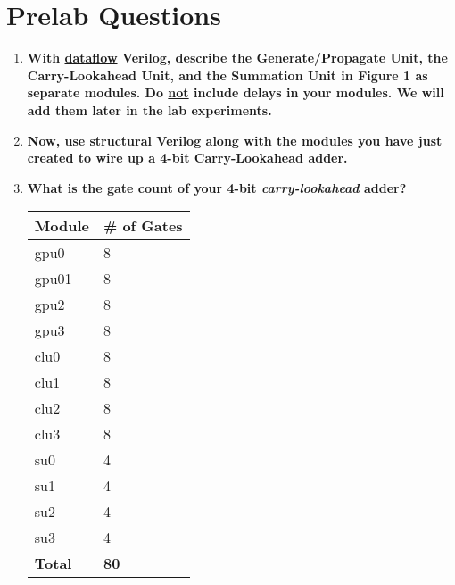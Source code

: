 \documentclass[a4paper,12pt]{article}
\begin{document}
\section*{Prelab Questions}

% 

\begin{enumerate}
  \item \textbf{With \underline{dataflow} Verilog, describe the Generate/Propagate Unit, the Carry-Lookahead Unit, and the Summation Unit in Figure 1 as separate modules. 
  Do \underline{not} include delays in your modules. We will add them later in the lab experiments.}
  
    
    
    
    
    

  \item \textbf{Now, use structural Verilog along with the modules you have just created to wire up a 4-bit Carry-Lookahead adder.}
  
  


  
  \item \textbf{What is the gate count of your 4-bit \textit{carry-lookahead} adder?}
  
  \begin{table}[h]
\centering
  \begin{tabular}{l l}
  Module & \# of Gates \\ \hline \hline
  gpu0   & 8           \\ 
  gpu01  & 8           \\ 
  gpu2   & 8           \\ 
  gpu3   & 8           \\ 
  clu0   & 8           \\ 
  clu1   & 8           \\ 
  clu2   & 8           \\ 
  clu3   & 8           \\ 
  su0    & 4           \\ 
  su1    & 4           \\ 
  su2    & 4           \\ 
  su3    & 4           \\ \hline
  \textbf{Total}  & \textbf{80}        
  \end{tabular}
\end{table}
  

\end{enumerate}
\end{document}
